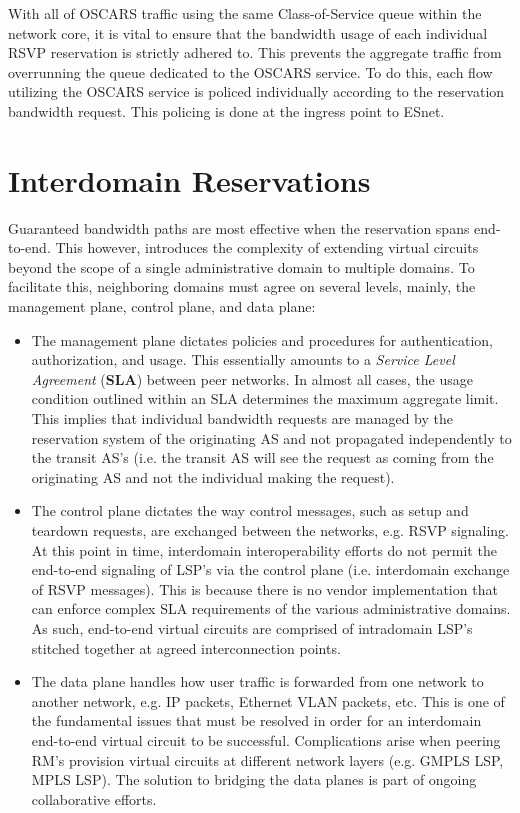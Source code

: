 \documentclass[conference]{IEEEtran}
\begin{document}
With all of OSCARS traffic using the same Class-of-Service queue within the 
network core, it is vital to ensure that the bandwidth usage of each 
individual 
RSVP reservation is strictly adhered to.  This prevents the aggregate traffic 
from overrunning the queue dedicated to the OSCARS service.  To do this, each 
flow utilizing the OSCARS service is policed individually according to the 
reservation bandwidth request.  This policing is done at the ingress point to 
ESnet.


\section{Interdomain Reservations}

Guaranteed bandwidth paths are most effective 
when the reservation spans end-to-end.  This however, introduces the 
complexity of extending virtual circuits beyond the scope of a 
single administrative domain to multiple domains.  To facilitate this, 
neighboring domains must agree on several levels, mainly, the management plane, 
control plane, and data plane:

\begin{itemize}
\item
The management plane dictates policies and procedures for authentication, 
authorization, and usage.  This essentially amounts to a \emph{Service Level 
Agreement} (\textbf{SLA}) between peer networks.  In almost all cases, the 
usage 
condition outlined within an SLA determines the maximum aggregate limit.  
This implies that individual bandwidth requests are managed by the reservation 
system of the originating AS and not propagated independently to the transit 
AS's 
(i.e. the transit AS will see the request as coming from the originating AS and not the individual making the request).

\item
The control plane dictates the way control messages, such as setup and 
teardown requests, are exchanged between the networks, e.g. RSVP signaling.
At this point in time, interdomain interoperability efforts do not permit
the end-to-end signaling of LSP's via the control plane (i.e. interdomain 
exchange of RSVP messages).  This is because
there is no vendor implementation that can enforce complex SLA requirements of 
the various administrative domains.  As such, end-to-end virtual circuits are
comprised
of intradomain LSP's stitched together at agreed interconnection points.

\item
The data plane handles how user traffic is forwarded from one network to 
another network, e.g. IP packets, Ethernet VLAN packets, etc.  This is one of 
the fundamental issues that must be resolved in order for an interdomain 
end-to-end virtual circuit to be successful.  Complications arise when 
peering RM's provision virtual circuits at different network layers (e.g. 
GMPLS LSP, MPLS LSP).  The solution to bridging the data planes is part of 
ongoing collaborative efforts.
\end{itemize}
\end{document}
